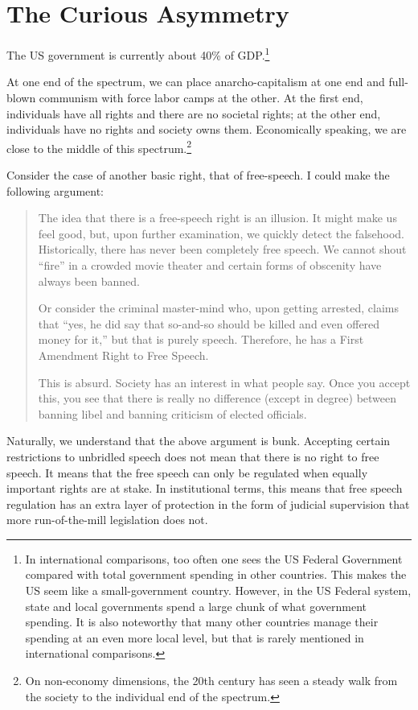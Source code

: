 \chapter{The Curious Asymmetry}

The US government is currently about 40\% of GDP.\footnote{In international
comparisons, too often one sees the US Federal Government compared with total
government spending in other countries. This makes the US seem like a
small-government country. However, in the US Federal system, state and local
governments spend a large chunk of what government spending. It is also
noteworthy that many other countries manage their spending at an even more
local level, but that is rarely mentioned in international comparisons.} 

At one end of the spectrum, we can place anarcho-capitalism at one end and
full-blown communism with force labor camps at the other. At the first end,
individuals have all rights and there are no societal rights; at the other end,
individuals have no rights and society owns them. Economically speaking, we are
close to the middle of this spectrum.\footnote{On non-economy dimensions, the
20th century has seen a steady walk from the society to the individual end of
the spectrum.}

Consider the case of another basic right, that of free-speech. I could make the
following argument:

\begin{quote}
The idea that there is a free-speech right is an illusion. It might make us
feel good, but, upon further examination, we quickly detect the falsehood.
Historically, there has never been completely free speech. We cannot shout
``fire'' in a crowded movie theater and certain forms of obscenity have always
been banned.

Or consider the criminal master-mind who, upon getting arrested, claims that
``yes, he did say that so-and-so should be killed and even offered money for
it,'' but that is purely speech. Therefore, he has a First Amendment Right to
Free Speech.

This is absurd. Society has an interest in what people say. Once you accept
this, you see that there is really no difference (except in degree) between
banning libel and banning criticism of elected officials.
\end{quote}

Naturally, we understand that the above argument is bunk. Accepting certain
restrictions to unbridled speech does not mean that there is no right to free
speech. It means that the free speech can only be regulated when equally
important rights are at stake. In institutional terms, this means that free
speech regulation has an extra layer of protection in the form of judicial
supervision that more run-of-the-mill legislation does not.

